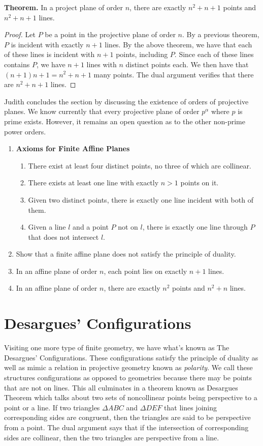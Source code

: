 \documentclass[12pt]{book}
\def\header #1{\noindent\textbf{#1}}
\begin{document}
\header{Theorem.} In a project plane of order $n$, there are exactly $n^2+n+1$ points and $n^2+n+1$ lines.
\begin{proof}
Let $P$ be a point in the projective plane of order $n$. By a previous theorem, $P$ is incident with exactly $n+1$ lines. By the above theorem, we have that each of these lines is incident with $n+1$ points, including $P$. Since each of these lines contains $P$, we have $n+1$ lines with $n$ distinct points each. We then have that $(n+1)n+1=n^2+n+1$ many points. The dual argument verifies that there are $n^2+n+1$ lines.
\end{proof}

Judith concludes the section by discussing the existence of orders of projective planes. We know currently that every projective plane of order $p^\alpha$ where $p$ is prime exists. However, it remains an open question as to the other non-prime power orders.

\begin{enumerate}
\item[] \textbf{Axioms for Finite Affine Planes}
\begin{enumerate}[label=\textbf{Axiom A\arabic*.}]
	\item There exist at least four distinct points, no three of which are collinear.
	\item There exists at least one line with exactly $n>1$ points on it.
	\item Given two distinct points, there is exactly one line incident with both of them.
	\item Given a line $l$ and a point $P$ not on $l$, there is exactly one line through $P$ that does not intersect $l$.
\end{enumerate}
\item Show that a finite affine plane does not satisfy the principle of duality.
\item In an affine plane of order $n$, each point lies on exactly $n+1$ lines.
\item In an affine plane of order $n$, there are exactly $n^2$ points and $n^2+n$ lines.
\end{enumerate}

\section{Desargues' Configurations}
Visiting one more type of finite geometry, we have what's known as The Desargues' Configurations. These configurations satisfy the principle of duality as well as mimic a relation in projective geometry known as \textit{polarity}. We call these structures configurations as opposed to geometries because there may be points that are not on lines. This all culminates in a theorem known as Desargues Theorem which talks about two sets of noncollinear points being perspective to a point or a line. If two triangles $\Delta ABC$ and $\Delta DEF$ that lines joining corresponding sides are congruent, then the triangles are said to be perspective from a point. The dual argument says that if the intersection of corresponding sides are collinear, then the two triangles are perspective from a line.\\
\end{document}

